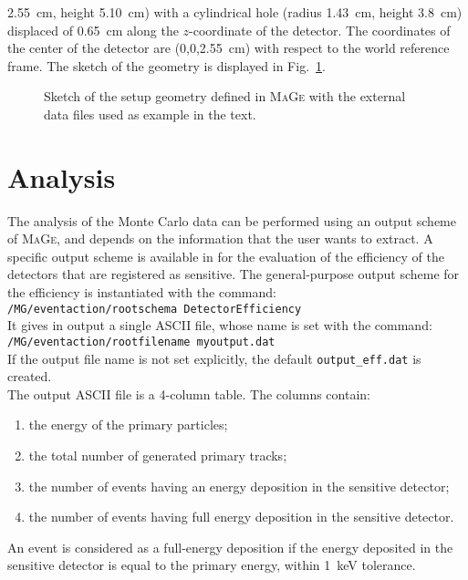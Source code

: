 \documentclass[a4paper,12pt,twoside]{article}
\begin{document}
2.55~cm, height 5.10~cm) with a cylindrical hole (radius 1.43~cm, height 3.8~cm) displaced 
of 0.65~cm along the $z$-coordinate of the detector. The coordinates of the center of the 
detector are (0,0,2.55~cm) with respect to the world reference frame. The sketch of the 
geometry is displayed in Fig.~\ref{testgeometry}. \\
\nopagebreak
\begin{figure}[tb]
\begin{center}
\mbox{}
\caption{Sketch of the setup geometry defined in \textsc{MaGe} with the external 
data files used as example in the text.}\label{testgeometry}
\end{center}
\end{figure}
%
\section{Analysis}
The analysis of the Monte Carlo data can be performed using an output scheme 
of \textsc{MaGe}, and depends on the information that the user wants to extract. A 
specific output scheme is available in \mage for the evaluation of the efficiency of the 
detectors that are registered as sensitive. The general-purpose output scheme for 
the efficiency is instantiated with the command: \\
\texttt{/MG/eventaction/rootschema DetectorEfficiency} \\
It gives in output a single ASCII file, whose name is set with the command: \\
\texttt{/MG/eventaction/rootfilename myoutput.dat}\\
If the output file name is not set explicitly, the default \texttt{output\_eff.dat} 
is created. \\
The output ASCII file is a 4-column table. The columns contain:
\begin{enumerate}
\item the energy of the primary particles;
\item the total number of generated primary tracks;
\item the number of events having an energy deposition in the sensitive detector;
\item the number of events having full energy deposition in the sensitive detector.
\end{enumerate}
An event is considered as a full-energy deposition if the energy deposited in the sensitive 
detector is equal to the primary energy, within 1~keV tolerance. 
%
\end{document}
